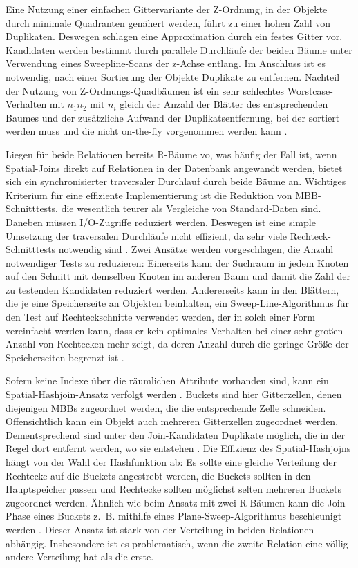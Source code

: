 \documentclass[a4paper,12pt,twoside]{article}
\begin{document}
Eine Nutzung einer einfachen Gittervariante der Z-Ordnung, in der Objekte durch minimale Quadranten genähert werden, führt zu einer hohen Zahl von Duplikaten. Deswegen schlagen {\textcite[S. 280f]{Rigaux2001}} eine Approximation durch ein festes Gitter vor. Kandidaten werden bestimmt durch parallele Durchläufe der beiden Bäume unter Verwendung eines Sweepline-Scans der z-Achse entlang. Im Anschluss ist es notwendig, nach einer Sortierung der Objekte Duplikate zu entfernen. Nachteil der Nutzung von Z-Ordnungs-Quadbäumen ist ein sehr schlechtes Worstcase-Verhalten mit $n_1 n_2$ mit $n_i$ gleich der Anzahl der Blätter des entsprechenden Baumes und der zusätzliche Aufwand der Duplikatsentfernung, bei der sortiert werden muss und die nicht on-the-fly vorgenommen werden kann {\autocite[S. 284]{Rigaux2001}}. 

Liegen für beide Relationen bereits R-Bäume vo, was häufig der Fall ist, wenn Spatial-Joins direkt auf Relationen in der Datenbank angewandt werden, bietet sich ein synchronisierter traversaler Durchlauf durch beide Bäume an. Wichtiges Kriterium für eine effiziente Implementierung ist die Reduktion von MBB-Schnitttests, die wesentlich teurer als Vergleiche von Standard-Daten sind. Daneben müssen I/O-Zugriffe reduziert werden. Deswegen ist eine simple Umsetzung der traversalen Durchläufe nicht effizient, da sehr viele Rechteck-Schnitttests notwendig sind {\autocite[S. 284f]{Rigaux2001}}. Zwei Ansätze werden vorgeschlagen, die Anzahl notwendiger Tests zu reduzieren: Einerseits kann der Suchraum in jedem Knoten auf den Schnitt mit demselben Knoten im anderen Baum und damit die Zahl der zu testenden Kandidaten reduziert werden. Andererseits kann in den Blättern, die je eine Speicherseite an Objekten beinhalten, ein Sweep-Line-Algorithmus für den Test auf Rechteckschnitte verwendet werden, der in solch einer Form vereinfacht werden kann, dass er kein optimales Verhalten bei einer sehr großen Anzahl von Rechtecken mehr zeigt, da deren Anzahl durch die geringe Größe der Speicherseiten begrenzt ist {\autocite[S. 286f]{Rigaux2001}}. 

Sofern keine Indexe über die räumlichen Attribute vorhanden sind, kann ein Spatial-Hashjoin-Ansatz verfolgt werden {\autocite[S. 288]{Rigaux2001}}. Buckets sind hier Gitterzellen, denen diejenigen MBBs zugeordnet werden, die die entsprechende Zelle schneiden. Offensichtlich kann ein Objekt auch mehreren Gitterzellen zugeordnet werden. Dementsprechend sind unter den Join-Kandidaten Duplikate möglich, die in der Regel dort entfernt werden, wo sie entstehen {\autocite{Zhou1998, Luo2002}}. Die Effizienz des Spatial-Hashjojns hängt von der Wahl der Hashfunktion ab: Es sollte eine gleiche Verteilung der Rechtecke auf die Buckets angestrebt werden, die Buckets sollten in den Hauptspeicher passen und Rechtecke sollten möglichst selten mehreren Buckets zugeordnet werden. Ähnlich wie beim Ansatz mit zwei R-Bäumen kann die Join-Phase eines Buckets z.~B. mithilfe eines Plane-Sweep-Algorithmus beschleunigt werden {\autocite[S. 290]{Rigaux2001}}. Dieser Ansatz ist stark von der Verteilung in beiden Relationen abhängig. Insbesondere ist es problematisch, wenn die zweite Relation eine völlig andere Verteilung hat als die erste.
\end{document}
